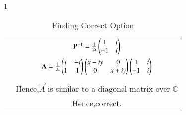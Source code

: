 \documentclass[journal,12pt,twocolumn]{IEEEtran}
\begin{document}
\begin{table*}[ht!]{1}
\begin{center}
\begin{tabular}{|c|c|}
&$\mathbf{P^{-1}}=\frac{1}{2i}\begin{pmatrix}1&i\\-1&i\end{pmatrix}$\\
&$\mathbf{A}=\frac{1}{2i}\begin{pmatrix}i&-i\\1&1\end{pmatrix}\begin{pmatrix}x-iy&0\\0&x+iy\end{pmatrix}\begin{pmatrix}1&i\\-1&i\end{pmatrix}$\\
&\\
&Hence,$\vec{A}$ is similar to a diagonal matrix over $\mathbb{C}$\\
&Hence,correct.\\
\hline
\end{tabular}
\caption{Finding Correct Option}
\label{table1}
\end{center}
\end{table*}

 
\end{document}
